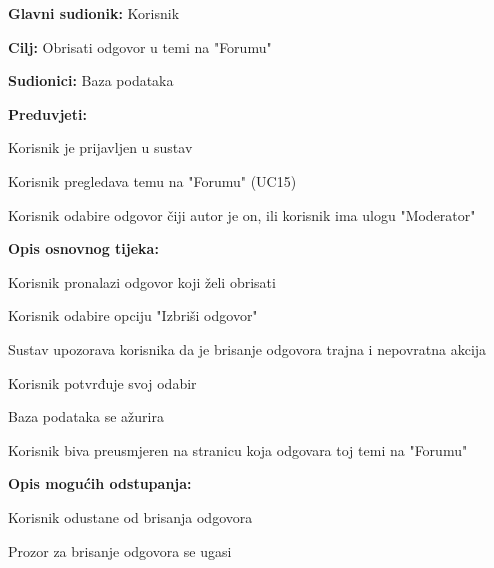					\noindent {}
					\begin{packed_item}
	
						\item \textbf{Glavni sudionik: }Korisnik
						\item  \textbf{Cilj:} Obrisati odgovor u temi na "Forumu"
						\item  \textbf{Sudionici:} Baza podataka
						\item  \textbf{Preduvjeti:}
						\item[] \begin{packed_enum}
							\item Korisnik je prijavljen u sustav
							\item Korisnik pregledava temu na "Forumu" (UC15)
							\item Korisnik odabire odgovor čiji autor je on, ili korisnik ima ulogu "Moderator"
						\end{packed_enum}
						\item  \textbf{Opis osnovnog tijeka:}
						
						\item[] \begin{packed_enum}
	
							\item Korisnik pronalazi odgovor koji želi obrisati
							\item Korisnik odabire opciju "Izbriši odgovor"
							\item Sustav upozorava korisnika da je brisanje odgovora trajna i nepovratna akcija
							\item Korisnik potvrđuje svoj odabir
							\item Baza podataka se ažurira
							\item Korisnik biva preusmjeren na stranicu koja odgovara toj temi na "Forumu"
							
							
						\end{packed_enum}
						
						\item  \textbf{Opis mogućih odstupanja:}
						
						\item[] \begin{packed_item}
						\item[4.a] Korisnik odustane od brisanja odgovora
							\item[] \begin{packed_enum}
								
								\item Prozor za brisanje odgovora se ugasi
								
							\end{packed_enum}
						\end{packed_item}
						
						
					\end{packed_item}
					
